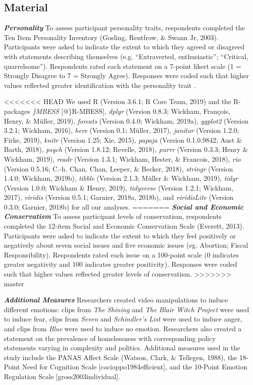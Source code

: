 \documentclass[man]{apa6}
\begin{document}
\hypertarget{material}{%
\subsection{Material}\label{material}}

\textbf{\emph{Personality}} To assess participant personality traits, respondents completed the Ten Item Personality Inventory (Gosling, Rentfrow, \& Swann Jr, 2003). Participants were asked to indicate the extent to which they agreed or disagreed with statements describing themselves (e.g. \enquote{Extraverted, enthusiastic}; \enquote{Critical, quarrelsome}). Respondents rated each statement on a 7-point likert scale (1 = Strongly Disagree to 7 = Strongly Agree). Responses were coded such that higher values reflected greater identification with the personality trait .

<<<<<<< HEAD
We used R (Version 3.6.1; R Core Team, 2019) and the R-packages
\emph{\}MBESS} {[}@\}R-MBESS{]}, \emph{dplyr} (Version 0.8.3; Wickham,
François, Henry, \& Müller, 2019), \emph{forcats} (Version 0.4.0;
Wickham, 2019a), \emph{ggplot2} (Version 3.2.1; Wickham, 2016),
\emph{here} (Version 0.1; Müller, 2017), \emph{janitor} (Version 1.2.0;
Firke, 2019), \emph{knitr} (Version 1.25; Xie, 2015), \emph{papaja}
(Version 0.1.0.9842; Aust \& Barth, 2018), \emph{psych} (Version 1.8.12;
Revelle, 2018), \emph{purrr} (Version 0.3.3; Henry \& Wickham, 2019),
\emph{readr} (Version 1.3.1; Wickham, Hester, \& Francois, 2018),
\emph{rio} (Version 0.5.16; C.-h. Chan, Chan, Leeper, \& Becker, 2018),
\emph{stringr} (Version 1.4.0; Wickham, 2019b), \emph{tibble} (Version
2.1.3; Müller \& Wickham, 2019), \emph{tidyr} (Version 1.0.0; Wickham \&
Henry, 2019), \emph{tidyverse} (Version 1.2.1; Wickham, 2017),
\emph{viridis} (Version 0.5.1; Garnier, 2018a, 2018b), and
\emph{viridisLite} (Version 0.3.0; Garnier, 2018b) for all our analyses.
=======
\textbf{\emph{Social and Economic Conservatism}} To assess participant levels of conservatism, respondents completed the 12-item Social and Economic Conservatism Scale (Everett, 2013). Participants were asked to indicate the extent to which they feel positively or negatively about seven social issues and five economic issues (eg. Abortion; Fiscal Responsibility). Respondents rated each issue on a 100-point scale (0 indicates greater negativity and 100 indicates greater positivity). Responses were coded such that higher values reflected greater levels of conservatism.
>>>>>>> master

\textbf{\emph{Additional Measures}} Researchers created video manipulations to induce different emotions: clips from \emph{The Shining} and \emph{The Blair Witch Project} were used to induce fear, clips from \emph{Seven} and \emph{Schindler's List} were used to induce anger, and clips from \emph{Blue} were used to induce no emotion. Researchers also created a statement on the prevalence of homelessness with corresponding policy statements varying in complexity and politics.
Additional measures used in the study include the PANAS Affect Scale (Watson, Clark, \& Tellegen, 1988), the 18-Point Need for Cognition Scale {[}cacioppo1984efficient{]}, and the 10-Point Emotion Regulation Scale {[}gross2003individual{]}.
\end{document}
